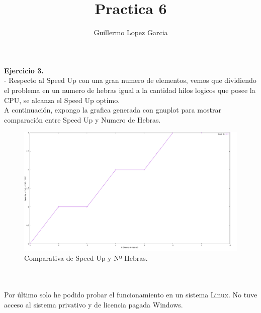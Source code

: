 \documentclass{minimal}
\title{Practica 6}
\author{Guillermo Lopez Garcia}
\begin{document}
\maketitle

\textbf{Ejercicio 3.} \\
- Respecto al Speed Up con una gran numero de elementos, vemos que dividiendo el problema en un numero de hebras igual
a la cantidad hilos logicos que posee la CPU, se alcanza el Speed Up optimo.
\\
A continuación, expongo la grafica generada con gnuplot para mostrar comparación entre 
Speed Up y Numero de Hebras.
\\
\begin{figure}
  \includegraphics[width=\linewidth]{img.png}
  \caption{Comparativa de Speed Up y Nº Hebras.}
\label{fig:comp}
\end{figure}
\\
\\
Por último solo he podido probar el funcionamiento en un sistema Linux. No tuve acceso al sistema privativo y de licencia pagada Windows.
\end{document}
